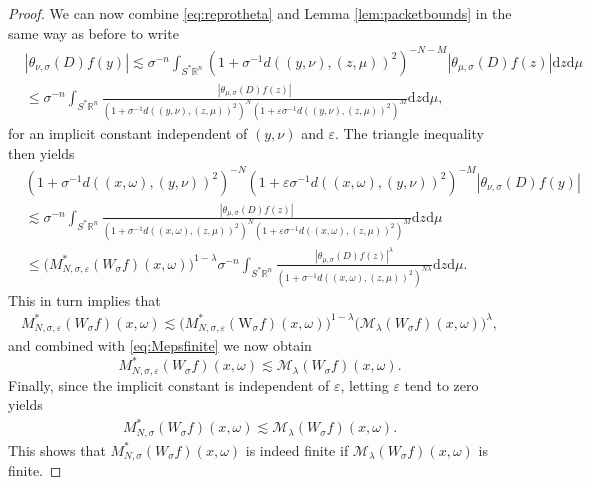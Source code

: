 \documentclass[10pt,a4paper]{amsart}
\newcommand {\Ma}{\mathcal{M}}
\newcommand {\Rn}{\mathbb{R}^{n}}
\newcommand {\Sp}{S^{*}\Rn}
\newcommand {\W}{\mathrm{W}}
\newcommand {\ud}{\mathrm{d}}
\newcommand {\veps}{\varepsilon}
\newcommand {\w}{\omega}
\begin{document}
\begin{proof}
We can now combine \eqref{eq:reprotheta} and Lemma \ref{lem:packetbounds} in the same way as before to write
\begin{align*}
&|\theta_{\nu,\sigma}(D)f(y)|\lesssim\sigma^{-n}
\int_{\Sp}(1+\sigma^{-1}d((y,\nu),(z,\mu))^{2})^{-N-M}|\theta_{\mu,{\sigma}}(D)f(z)|\ud z\ud\mu\\
&\leq \sigma^{-n}
\int_{\Sp}\frac{|\theta_{\mu,\sigma}(D)f(z)|}{(1+\sigma^{-1}d((y,\nu),(z,\mu))^{2})^{N}(1+\veps\sigma^{-1}d((y,\nu),(z,\mu))^{2})^{M}}\ud z\ud\mu,
\end{align*}
for an implicit constant independent of $(y,\nu)$ and $\veps$. The triangle inequality then yields
\begin{align*}
&(1+\sigma^{-1}d((x,\omega),(y,\nu))^{2})^{-N}(1+\veps\sigma^{-1}d((x,\omega),(y,\nu))^{2})^{-M}|\theta_{\nu,\sigma}(D)f(y)|\\
&\lesssim\sigma^{-n}\int_{\Sp}\frac{|\theta_{\mu,\sigma}(D)f(z)|}{(1+\sigma^{-1}d((x,\w),(z,\mu))^{2})^{N}(1+\veps\sigma^{-1}d((x,\w),(z,\mu))^{2})^{M}}\ud z\ud\mu\\
&\leq \big(M_{N,\sigma,\veps}^{*}(W_{\sigma}f)(x,\omega)\big)^{1-\lambda}
\sigma^{-n}\int_{\Sp}\frac{|\theta_{\mu,{\sigma}}(D)f(z)|^{\lambda}}{(1+\sigma^{-1}d((x,\omega),(z,\mu))^{2})^{N\lambda}}
 \ud z\ud\mu.
\end{align*}
This in turn implies that
\begin{align*}
M_{N,\sigma,\veps}^{*}(W_{\sigma}f)(x,\omega)\lesssim \big(M_{N,\sigma,\veps}^{*}(\W_{\sigma}f)(x,\omega)\big)^{1-\lambda}\big(\Ma_{\lambda}(W_{\sigma}f)(x,\omega)\big)^{\lambda},
\end{align*}
and combined with \eqref{eq:Mepsfinite} we now obtain
\[
M_{N,\sigma,\veps}^{*}(W_{\sigma}f)(x,\omega)\lesssim\Ma_{\lambda}(W_{\sigma}f)(x,\omega).
\]
Finally, since the implicit constant is independent of $\veps$, letting $\varepsilon$ tend to zero yields
\begin{align*}
M_{N,\sigma}^{*}(W_{\sigma}f)(x,\omega)\lesssim\Ma_{\lambda}(W_{\sigma}f)(x,\omega).
\end{align*}
This shows that $M_{N,\sigma}^{*}(W_{\sigma}f)(x,\omega)$ is indeed finite if $\Ma_{\lambda}(W_{\sigma}f)(x,\omega)$ is finite. %
\end{proof}
\end{document}
